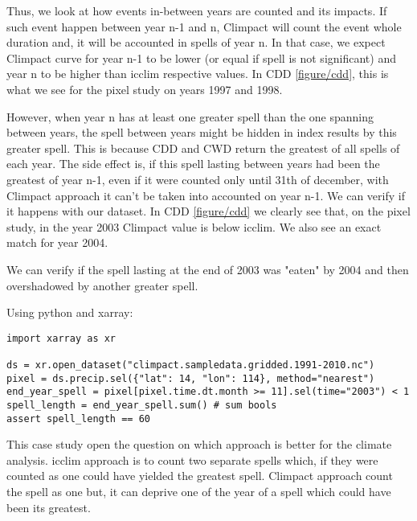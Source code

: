 \documentclass[a4paper,11pt]{article}
\begin{document}
            Thus, we look at how events in-between years are counted and its impacts.
            If such event happen between year n-1 and n, Climpact will count the event whole duration and, it will be accounted in spells of year n.
            In that case, we expect Climpact curve for year n-1 to be lower (or equal if spell is not significant) and year n to be higher than icclim respective values.
            In CDD \ref{figure/cdd}, this is what we see for the pixel study on years 1997 and 1998.

            However, when year n has at least one greater spell than the one spanning between years, the spell between years might be hidden in index results by this greater spell.
            This is because CDD and CWD return the greatest of all spells of each year.
            The side effect is, if this spell lasting between years had been the greatest of year n-1, even if it were counted only until 31th of december, with Climpact approach it can't be taken into accounted on year n-1.
            We can verify if it happens with our dataset. In CDD \ref{figure/cdd} we clearly see that, on the pixel study, in the year 2003 Climpact value is below icclim.
            We also see an exact match for year 2004.
            
            We can verify if the spell lasting at the end of 2003 was "eaten" by 2004 and then overshadowed by another greater spell. 
            
            Using python and xarray:
            
            \begin{minipage}{\linewidth}
            \begin{lstlisting}
import xarray as xr

ds = xr.open_dataset("climpact.sampledata.gridded.1991-2010.nc")
pixel = ds.precip.sel({"lat": 14, "lon": 114}, method="nearest")
end_year_spell = pixel[pixel.time.dt.month >= 11].sel(time="2003") < 1
spell_length = end_year_spell.sum() # sum bools
assert spell_length == 60
            \end{lstlisting}
            \end{minipage}

            This case study open the question on which approach is better for the climate analysis.
            icclim approach is to count two separate spells which, if they were counted as one could have yielded the greatest spell.
            Climpact approach count the spell as one but, it can deprive one of the year of a spell which could have been its greatest.
\end{document}
